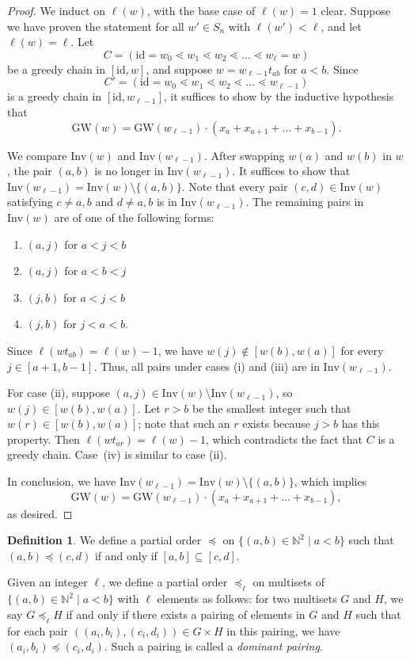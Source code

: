 \documentclass[11pt]{article}
\theoremstyle{definition}
\newtheorem{defi}[theo]{Definition}
\numberwithin{equation}{section}
\newcommand{\GW}{\mathrm{GW}}
\newcommand{\id}{\mathrm{id}}
\newcommand{\Inv}{\mathrm{Inv}}
\newcommand{\N}{\mathbb{N}}
\begin{document}
\begin{proof}
   We induct on $\ell(w)$, with the base case of $\ell(w) = 1$ clear. Suppose we have proven the statement for all $w'\in S_n$ with $\ell(w') < \ell$, and let $\ell(w) = \ell$. Let 
    \[C=(\id=w_0\lessdot w_1\lessdot w_2\lessdot \dots \lessdot w_{\ell} =w)\] 
    be a greedy chain in $[\id,w]$, and suppose $w=w_{\ell-1}t_{ab}$ for $a < b$. Since
    \[C'=(\id=w_0\lessdot w_1\lessdot w_2\lessdot \dots \lessdot w_{\ell-1})\] 
    is a greedy chain in $[\id, w_{\ell-1}]$, it suffices to show by the inductive hypothesis that
    \[\GW(w)=\GW(w_{\ell-1})\cdot (x_{a}+x_{a+1}+\dots+x_{b-1}).\]
    
    We compare $\Inv(w)$ and $\Inv(w_{\ell-1})$. After swapping $w(a)$ and $w(b)$ in $w$, the pair $(a, b)$ is no longer in $\Inv(w_{\ell-1})$. It suffices to show that $\Inv(w_{\ell-1})=\Inv(w)\setminus \{(a,b)\}$. Note that every pair $(c,d)\in \Inv(w)$ satisfying $c\neq a, b$ and $d\neq a, b$ is in $\Inv(w_{\ell-1})$. The remaining pairs in $\Inv(w)$ are of one of the following forms:
    \begin{enumerate}[label=\textnormal{(\roman*)}]
        \item $(a,j)$ for $a<j<b$
        \item $(a,j)$ for $a<b<j$
        \item $(j,b)$ for $a<j<b$
        \item $(j,b)$ for $j<a<b$.
    \end{enumerate}

    Since $\ell(wt_{ab})=\ell(w)-1$, we have $w(j)\notin [w(b),w(a)]$ for every $j\in [a+1,b-1]$. Thus, all pairs under cases (i) and (iii) are in $\Inv(w_{\ell-1})$.

    For case (ii), suppose $(a,j)\in \Inv(w)\setminus \Inv(w_{\ell-1})$, so $w(j)\in [w(b),w(a)]$. Let $r > b$ be the smallest integer such that $w(r)\in [w(b), w(a)]$; note that such an $r$ exists because $j > b$ has this property. Then $\ell(wt_{ar})=\ell(w)-1$, which contradicts the fact that $C$ is a greedy chain. Case~(iv) is similar to case (ii).

    In conclusion, we have $\Inv(w_{\ell-1})=\Inv(w)\setminus \{(a,b)\}$, which implies
    \[\GW(w)=\GW(w_{\ell-1})\cdot (x_{a}+x_{a+1}+\dots+x_{b-1}),\] as desired.
\end{proof}


\begin{defi}\label{def:dominant pairing}
    We define a partial order $\preceq$ on $\{(a,b)\in \N^2\mid a<b\}$ such that $(a,b)\preceq (c,d)$ if and only if $[a,b]\subseteq [c,d]$. 

    Given an integer $\ell$, we define a partial order $\preceq_{\ell}$ on multisets of $\{(a,b)\in \N^2\mid a<b\}$ with $\ell$ elements as follows: for two multisets $G$ and $H$, we say $G \preceq_{\ell} H$ if and only if there exists a pairing of elements in $G$ and $H$ such that for each pair $((a_i,b_i),(c_i,d_i))\in G\times H$ in this pairing, we have $(a_i,b_i)\preceq (c_i,d_i)$. Such a pairing is called a \emph{dominant pairing}.
\end{defi}
\end{document}
